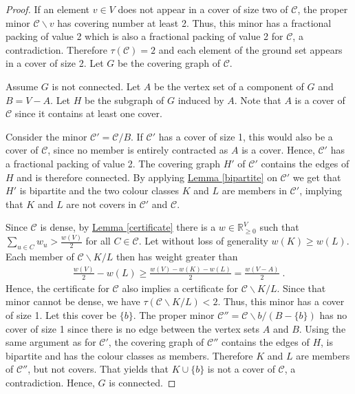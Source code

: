 \documentclass[a4paper, 12pt]{scrbook}
\theoremstyle{definition}
\newcommand*{\IR}{\ensuremath{\mathbb{R}}}
\begin{document}
   \begin{proof}
       If an element $v \in V$ does not appear in a cover of size two of $\mathcal{C}$, the proper minor $\mathcal{C} \backslash v$ has covering number at least 2.
       Thus, this minor has a fractional packing of value 2 which is also a fractional packing of value 2 for $\mathcal{C}$, a contradiction.
       Therefore $\tau(\mathcal{C}) = 2$ and each element of the ground set appears in a cover of size 2.
       Let $G$ be the covering graph of $\mathcal{C}$.

       Assume $G$ is not connected.
       Let $A$ be the vertex set of a component of $G$ and $B = V - A$.
       Let $H$ be the subgraph of $G$ induced by $A$.
       Note that $A$ is a cover of $\mathcal{C}$ since it contains at least one cover.

       Consider the minor $\mathcal{C'}=\mathcal{C}/B$.
       If $\mathcal{C'}$ has a cover of size 1, this would also be a cover of $\mathcal{C}$, since no member is entirely contracted as $A$ is a cover.
       Hence, $\mathcal{C'}$ has a fractional packing of value 2.
       The covering graph $H'$ of $\mathcal{C'}$ contains the edges of $H$ and is therefore connected.
       By applying \hyperref[bipartite]{Lemma \ref*{bipartite}} on $\mathcal{C'}$ we get that $H'$ is bipartite and the two colour classes $K$ and $L$ are members in $\mathcal{C'}$, implying that $K$ and $L$ are not covers in $\mathcal{C'}$ and $\mathcal{C}$.

       Since $\mathcal{C}$ is dense, by \hyperref[certificate]{Lemma \ref*{certificate}} there is a $w \in \IR^V_{\geq 0}$ such that $\sum_{u\in C} w_u > \frac{w(V)}{2}$ for all $C \in \mathcal{C}$.
       Let without loss of generality $w(K) \geq w(L)$.
       Each member of $\mathcal{C} \backslash K / L$ then has weight greater than
       \begin{align*}
           \frac{w(V)}{2} - w(L) \geq \frac{w(V)-w(K)-w(L)}{2} = \frac{w(V-A)}{2} \;.
       \end{align*}
       Hence, the certificate for $\mathcal{C}$ also implies a certificate for $\mathcal{C}\backslash K /L$.
       Since that minor cannot be dense, we have $\tau(\mathcal{C}\backslash K /L)<2$.
       Thus, this minor has a cover of size 1.
       Let this cover be $\{b\}$.
       The proper minor $\mathcal{C''}=\mathcal{C} \backslash b / (B-\{b\})$ has no cover of size 1 since there is no edge between the vertex sets $A$ and $B$.
       Using the same argument as for $\mathcal{C'}$, the covering graph of $\mathcal{C''}$ contains the edges of $H$, is bipartite and has the colour classes as members.
       Therefore $K$ and $L$ are members of $\mathcal{C''}$, but not covers.
       That yields that $K \cup \{b\}$ is not a cover of $\mathcal{C}$, a contradiction.
       Hence, $G$ is connected.
   \end{proof}
\end{document}
